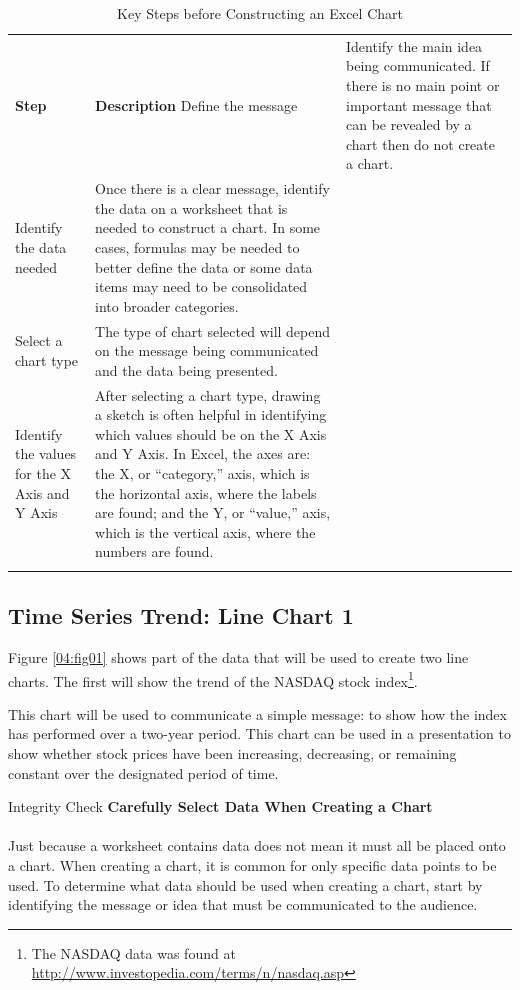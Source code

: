 \begin{table}[H]
	{\small
		\begin{longtable}{L{0.75in}L{3.50in}} %
			\textbf{Step} & \textbf{Description} \endhead
			\hline
			Define the message & Identify the main idea being communicated. If there is no main point or important message that can be revealed by a chart then do not create a chart.\\
			Identify the data needed & Once there is a clear message, identify the data on a worksheet that is needed to construct a chart. In some cases, formulas may be needed to better define the data or some data items may need to be consolidated into broader categories.\\
			Select a chart type & The type of chart selected will depend on the message being communicated and the data being presented.\\
			Identify the values for the X Axis and Y Axis & After selecting a chart type, drawing a sketch is often helpful in identifying which values should be on the X Axis and Y Axis. In Excel, the axes are: the X, or ``category,'' axis, which is the horizontal axis, where the labels are found; and the Y, or ``value,'' axis, which is the vertical axis, where the numbers are found.\\
			\caption{Key Steps before Constructing an Excel Chart}
			\label{04:tab01}
		\end{longtable}
	} %
\end{table}

\subsection{Time Series Trend: Line Chart 1}

Figure \ref{04:fig01} shows part of the data that will be used to create two line charts. The first will show the trend of the NASDAQ stock index\footnote{The NASDAQ data was found at \url{http://www.investopedia.com/terms/n/nasdaq.asp}}.

This chart will be used to communicate a simple message: to show how the index has performed over a two-year period. This chart can be used in a presentation to show whether stock prices have been increasing, decreasing, or remaining constant over the designated period of time.

\begin{center}
	\begin{infobox}{Integrity Check}
		\textbf{Carefully Select Data When Creating a Chart}
		\\
		\\
		Just because a worksheet contains data does not mean it must all be placed onto a chart. When creating a chart, it is common for only specific data points to be used. To determine what data should be used when creating a chart, start by identifying the message or idea that must be communicated to the audience.
	\end{infobox}
\end{center}

